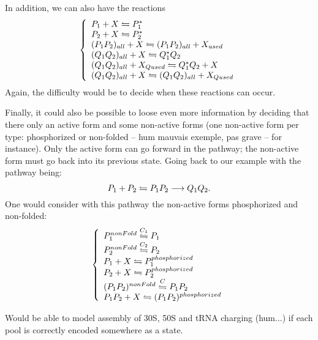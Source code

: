 In addition, we can also have the reactions
$$
  \left\{
    \begin{array}{l}
      \reaction{P_1 + X}{P_1^*}{} \\
      \reaction{P_2 + X}{P_2^*}{} \\
      \reaction{(P_1P_2)_{all} + X}{(P_1P_2)_{all} + X_{used}}{} \\
      \reaction{(Q_1Q_2)_{all} + X}{Q_1^*Q_2}{} \\
      \reaction{(Q_1Q_2)_{all} + X_{Qused}}{Q_1^*Q_2 + X}{} \\
      \reaction{(Q_1Q_2)_{all} + X}{(Q_1Q_2)_{all} + X_{Qused}}{} \\
    \end{array}
  \right.
$$
Again, the difficulty would be to decide when these reactions can occur.

Finally, it could also be possible to loose even more information by deciding that there only an active form and some non-active forms (one non-active form per type: phosphorized or non-folded -- hum mauvais exemple, pas grave -- for instance). Only the active form can go forward in the pathway; the non-active form must go back into its previous state. Going back to our example with the pathway being:
$$
  \reaction{P_1+P_2}{P_1P_2}{} \longrightarrow Q_1Q_2 .
$$
One would consider with this pathway the non-active forms phosphorized and non-folded:
$$
  \left\{
    \begin{array}{l}
      \reaction{P_1^{nonFold}}{P_1}{C_1} \\
      \reaction{P_2^{nonFold}}{P_2}{C_2} \\
      \reaction{P_1 + X}{P_1^{phosphorized}}{} \\
      \reaction{P_2 + X}{P_2^{phosphorized}}{} \\
      \reaction{(P_1P_2)^{nonFold}}{P_1P_2}{C} \\
      \reaction{P_1P_2 + X}{(P_1P_2)^{phosphorized}}{} \\
    \end{array}
  \right.
$$



\medskip

\textcolor[rgb]{1.00,0.00,0.00}{Would be able to model assembly of 30S, 50S and tRNA charging (hum...) if each pool is correctly encoded somewhere as a state.
} 